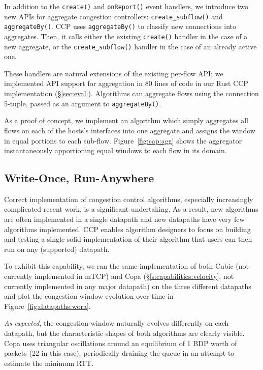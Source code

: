 %

 In addition to the \texttt{create()} and \texttt{onReport()} event handlers, we introduce two new APIs for aggregate congestion controllers: \texttt{create\_subflow()} and \texttt{aggregateBy()}.
CCP uses \texttt{aggregateBy()} to classify new connections into aggregates. Then, it calls either the existing \texttt{create()} handler in the case of a new aggregate, or the \texttt{create\_subflow()} handler in the case of an already active one.

These handlers are natural extensions of the existing per-flow API; we implemented API support for aggregation in $80$ lines of code in our Rust CCP implementation (\S\ref{sec:eval}).
Algorithms can aggregate flows using the connection 5-tuple, passed as an argument to \texttt{aggregateBy()}.

As a proof of concept, we implement an algorithm which simply aggregates all flows on each of the hosts's interfaces into one aggregate and assigns the window in equal portions to each sub-flow.
Figure~\ref{fig:cap:agg} shows the aggregator instantaneously apportioning equal windows to each flow in its domain.

 
\subsection{Write-Once, Run-Anywhere}
\label{s:capabilities:wora}
\label{s:datapaths:eval}

Correct implementation of congestion control algorithms, especially increasingly complicated recent work, is a significant undertaking.
As a result, new algorithms are often implemented in a single datapath and new datapaths have very few algorithms implemented. 
CCP enables algorithm designers to focus on building and testing a single solid implementation of their algorithm that users can then run on any (supported) datapath. 

To exhibit this capability, we ran the same implementation of both Cubic (not currently implemented in mTCP) and Copa (\S\ref{s:capabilities:velocity}, not currently implemented in any major datapath) on the three different datapaths and plot the congestion window evolution over time in Figure~\ref{fig:datapaths:wora}.

\textit{As expected}, the congestion window naturally evolves differently on each datapath, but the characteristic shapes of both algorithms are clearly visible. Copa uses triangular oscillations around an equilibrium of 1 BDP worth of packets (22 in this case), periodically draining the queue in an attempt to estimate the minimum RTT.